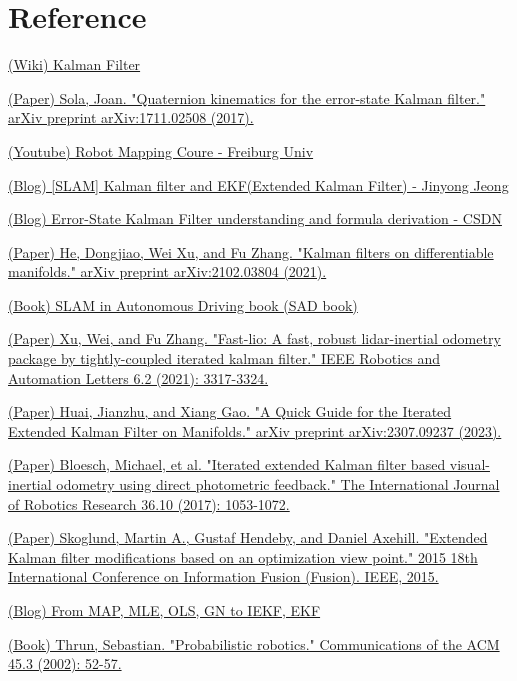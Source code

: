 \documentclass[10pt]{article}
\begin{document}
	\section{Reference}
	\begin{enumerate}[label={[\arabic*]}]
		\item \href{https://en.wikipedia.org/wiki/Kalman_filter}{(Wiki) Kalman Filter}
		\item \href{https://arxiv.org/abs/1711.02508}{(Paper) Sola, Joan. "Quaternion kinematics for the error-state Kalman filter." arXiv preprint arXiv:1711.02508 (2017).}
		\item \href{https://youtu.be/wVsfCnyt5jA}{(Youtube) Robot Mapping Coure - Freiburg Univ}
		\item \href{http://jinyongjeong.github.io/2017/02/14/lec03_kalman_filter_and_EKF/}{(Blog) [SLAM] Kalman filter and EKF(Extended Kalman Filter)
			- Jinyong Jeong} \label{ref:4}
		\item \href{https://blog.csdn.net/liu3612162/article/details/114120772}{(Blog) Error-State Kalman Filter understanding and formula derivation - CSDN} \label{ref:5}
		\item \href{https://arxiv.org/pdf/2102.03804.pdf}{(Paper) He, Dongjiao, Wei Xu, and Fu Zhang. "Kalman filters on differentiable manifolds." arXiv preprint arXiv:2102.03804 (2021).} \label{ref:6}
		\item \href{https://github.com/gaoxiang12/slam_in_autonomous_driving}{(Book) SLAM in Autonomous Driving book (SAD book)}\label{ref:7}
		\item \href{https://arxiv.org/pdf/2010.08196.pdf}{(Paper) Xu, Wei, and Fu Zhang. "Fast-lio: A fast, robust lidar-inertial odometry package by tightly-coupled iterated kalman filter." IEEE Robotics and Automation Letters 6.2 (2021): 3317-3324.} \label{ref:8}
		\item \href{https://arxiv.org/pdf/2307.09237.pdf}{(Paper) Huai, Jianzhu, and Xiang Gao. "A Quick Guide for the Iterated Extended Kalman Filter on Manifolds." arXiv preprint arXiv:2307.09237 (2023).} \label{ref:9}
		\item \href{https://www.research-collection.ethz.ch/bitstream/handle/20.500.11850/263423/1/ROVIO.pdf}{(Paper) Bloesch, Michael, et al. "Iterated extended Kalman filter based visual-inertial odometry using direct photometric feedback." The International Journal of Robotics Research 36.10 (2017): 1053-1072.} \label{ref:10}
		\item \href{https://ieeexplore.ieee.org/stamp/stamp.jsp?tp=&arnumber=7266781}{(Paper) Skoglund, Martin A., Gustaf Hendeby, and Daniel Axehill. "Extended Kalman filter modifications based on an optimization view point." 2015 18th International Conference on Information Fusion (Fusion). IEEE, 2015.} \label{ref:11}
		\item \href{https://cgabc.xyz/posts/784a80cb/}{(Blog) From MAP, MLE, OLS, GN to IEKF, EKF} \label{ref:12}
		\item \href{https://docs.ufpr.br/~danielsantos/ProbabilisticRobotics.pdf}{(Book) Thrun, Sebastian. "Probabilistic robotics." Communications of the ACM 45.3 (2002): 52-57.} \label{ref:13}
	\end{enumerate}
	
\end{document}
